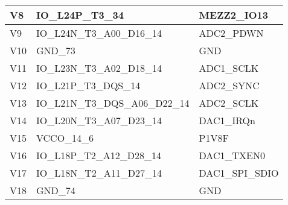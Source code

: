 \begin{footnotesize}
\begin{longtable}{|l|p{6cm}|p{6cm}|}
V8	&	IO\_L24P\_T3\_34	&	MEZZ2\_IO13	\\ \hline
V9	&	IO\_L24N\_T3\_A00\_D16\_14	&	ADC2\_PDWN	\\ \hline
V10	&	GND\_73	&	GND	\\ \hline
V11	&	IO\_L23N\_T3\_A02\_D18\_14	&	ADC1\_SCLK	\\ \hline
V12	&	IO\_L21P\_T3\_DQS\_14	&	ADC2\_SYNC	\\ \hline
V13	&	IO\_L21N\_T3\_DQS\_A06\_D22\_14	&	ADC2\_SCLK	\\ \hline
V14	&	IO\_L20N\_T3\_A07\_D23\_14	&	DAC1\_IRQn	\\ \hline
V15	&	VCCO\_14\_6	&	P1V8F	\\ \hline
V16	&	IO\_L18P\_T2\_A12\_D28\_14	&	DAC1\_TXEN0	\\ \hline
V17	&	IO\_L18N\_T2\_A11\_D27\_14	&	DAC1\_SPI\_SDIO	\\ \hline
V18	&	GND\_74	&	GND	\\ \hline


		
\end{longtable}
\end{footnotesize}